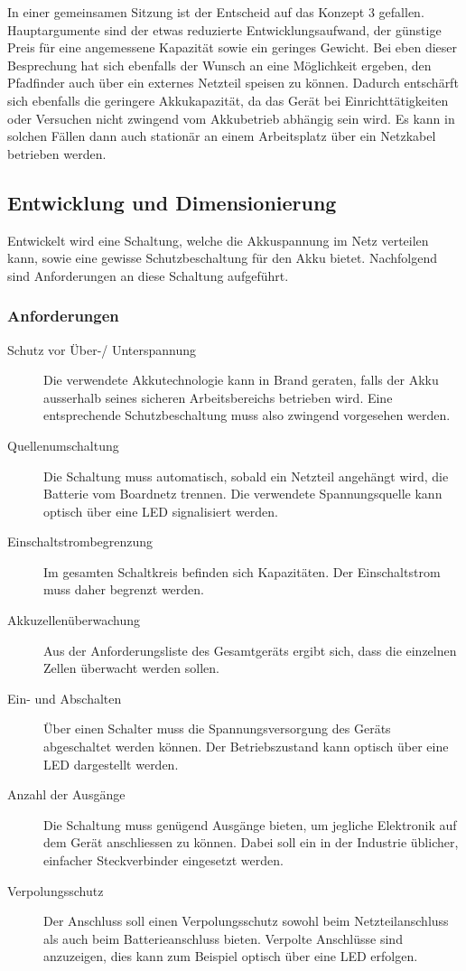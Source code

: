 \documentclass[main.tex]{subfiles} %
\begin{document}
In einer gemeinsamen Sitzung ist der Entscheid auf das Konzept 3 gefallen.
Hauptargumente sind der etwas reduzierte Entwicklungsaufwand, der günstige
Preis für eine angemessene Kapazität sowie ein geringes Gewicht. Bei eben
dieser Besprechung hat sich ebenfalls der Wunsch an eine Möglichkeit ergeben,
den Pfadfinder auch über ein externes Netzteil speisen zu können. Dadurch
entschärft sich ebenfalls die geringere Akkukapazität, da das Gerät bei
Einrichttätigkeiten oder Versuchen nicht zwingend vom Akkubetrieb abhängig sein
wird. Es kann in solchen Fällen dann auch stationär an einem Arbeitsplatz über
ein Netzkabel betrieben werden.

\subsection{Entwicklung und Dimensionierung}

Entwickelt wird eine Schaltung, welche die Akkuspannung im Netz verteilen kann,
sowie eine gewisse Schutzbeschaltung für den Akku bietet. Nachfolgend sind
Anforderungen an diese Schaltung aufgeführt.

\subsubsection{Anforderungen}
\begin{description}
    \item[Schutz vor Über-/ Unterspannung] Die verwendete Akkutechnologie kann in Brand
          geraten, falls der Akku ausserhalb seines sicheren Arbeitsbereichs betrieben
          wird. Eine entsprechende Schutzbeschaltung muss also zwingend vorgesehen
          werden.
    \item[Quellenumschaltung] Die Schaltung muss automatisch, sobald ein Netzteil
          angehängt wird, die Batterie vom Boardnetz trennen. Die verwendete
          Spannungsquelle kann optisch über eine LED signalisiert werden.
    \item[Einschaltstrombegrenzung] Im gesamten Schaltkreis befinden sich Kapazitäten.
          Der Einschaltstrom muss daher begrenzt werden.
    \item[Akkuzellenüberwachung] Aus der Anforderungsliste des Gesamtgeräts ergibt sich,
          dass die einzelnen Zellen überwacht werden sollen.
    \item[Ein- und Abschalten] Über einen Schalter muss die Spannungsversorgung des
          Geräts abgeschaltet werden können. Der Betriebszustand kann optisch über eine
          LED dargestellt werden.
    \item[Anzahl der Ausgänge] Die Schaltung muss genügend Ausgänge bieten, um jegliche
          Elektronik auf dem Gerät anschliessen zu können. Dabei soll ein in der
          Industrie üblicher, einfacher Steckverbinder eingesetzt werden.
    \item[Verpolungsschutz] Der Anschluss soll einen Verpolungsschutz sowohl beim
          Netzteilanschluss als auch beim Batterieanschluss bieten. Verpolte Anschlüsse
          sind anzuzeigen, dies kann zum Beispiel optisch über eine LED erfolgen.
\end{description}
\end{document}
